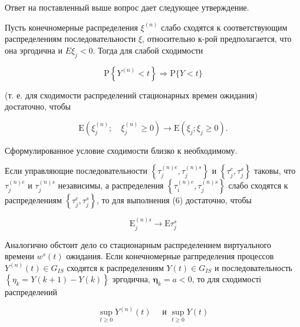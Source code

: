 \documentclass[10pt]{article}
\begin{document}
Ответ на поставленный выше вопрос дает следующее утверждение.



Пусть конечномерные распределения $\xi^{(n)}$ слабо сходятся к соответствующим распределениям последовательности $\xi$, относительно к-рой предполагается, что она эргодична и $E \xi_{j}<0$. Тогда для слабой сходимости



\[

\mathrm{P}\left\{Y^{(n)}<t\right\} \Rightarrow \mathrm{P}\{Y<t\}

\]



(т. е. для сходимости распределений стационарных времен ожидания) достаточно, чтобы



\[

\mathrm{E}\left(\xi_{j}^{(n)} ; \quad \xi_{j}^{(n)} \geqslant 0\right) \longrightarrow \mathrm{E}\left(\xi_{j} ; \xi_{j} \geqslant 0\right) .

\]



Сформулированное условие сходимости близко к необходимому.



Если управляющие последовательности $\left\{\tau_{j}^{(n) e}, \tau_{j}^{(n) s}\right\}$ и $\left\{\tau_{j}^{e}, \tau_{j}^{s}\right\}$ таковы, что $\tau_{j}^{(n) e}$ и $\tau_{j}^{(n) s}$ независимы, а распределения $\left\{\tau_{i}^{(n) e}, \tau_{j}^{(n) s}\right\}$ слабо сходятся к распределениям $\left\{\tau_{j}^{e}, \tau_{j}^{s}\right\}$, то для выполнения (6) достаточно, чтобы



\[

\mathrm{E}_{j}^{(n) s} \rightarrow \mathrm{E} \tau_{j}^{s}

\]



Аналогично обстоит дело со стационарным распределением виртуального времени $w^{s}(t)$ ожидания. Если конечномерные рагпределения процессов $Y^{(n)}(t) \in G_{I S}$ сходятся к распределениям $Y(t) \in G_{I S}$ и последовательность $\left\{\eta_{k}=Y(k+1)-Y(k)\right\}$ эргодична, $\boldsymbol{\eta}_{k}=a<0$, то для сходимості распределений



\[

\sup _{t \geqslant 0} Y^{(n)}(t) \quad \text { и } \sup _{t \geqslant 0} Y(t)

\]
\end{document}
